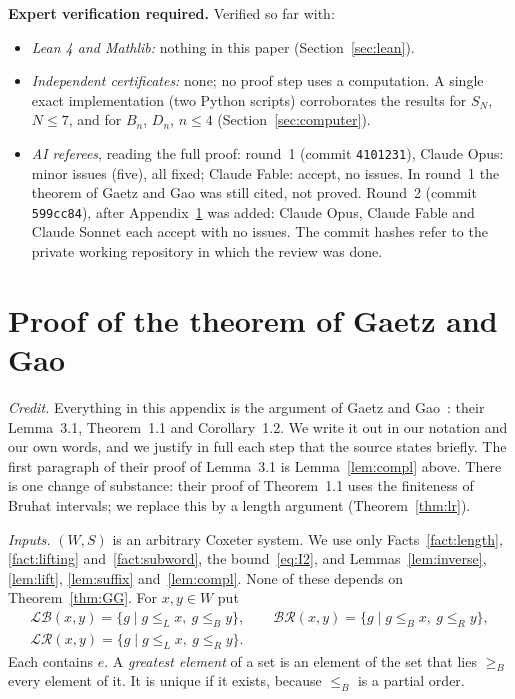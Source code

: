 \documentclass[11pt]{amsart}
\theoremstyle{definition}
\theoremstyle{remark}
\numberwithin{equation}{section}
\newcommand{\LB}{\mathcal{LB}}
\newcommand{\BR}{\mathcal{BR}}
\newcommand{\LR}{\mathcal{LR}}
\newcommand{\leR}{\le_R}
\newcommand{\leL}{\le_L}
\newcommand{\leB}{\le_B}
\newcommand{\geB}{\ge_B}
\begin{document}
\textbf{Expert verification required.} Verified so far with:
\begin{itemize}
\item \emph{Lean 4 and Mathlib:} nothing in this paper (Section~\ref{sec:lean}).
\item \emph{Independent certificates:} none; no proof step uses a computation. A single exact implementation (two Python scripts) corroborates the results for \(S_N\), \(N\le7\), and for \(B_n\), \(D_n\), \(n\le4\) (Section~\ref{sec:computer}).
\item \emph{AI referees}, reading the full proof:
round~1 (commit \texttt{4101231}), Claude Opus: minor issues (five), all fixed; Claude Fable: accept, no issues. In round~1 the theorem of Gaetz and Gao was still cited, not proved.
Round~2 (commit \texttt{599cc84}), after Appendix~\ref{app:GG} was added: Claude Opus, Claude Fable and Claude Sonnet each accept with no issues.
The commit hashes refer to the private working repository in which the review was done.
\end{itemize}

\appendix

\section{Proof of the theorem of Gaetz and Gao}\label{app:GG}

\emph{Credit.} Everything in this appendix is the argument of Gaetz and Gao~\cite[\S3]{GG}: their Lemma~3.1, Theorem~1.1 and Corollary~1.2. We write it out in our notation and our own words, and we justify in full each step that the source states briefly. The first paragraph of their proof of Lemma~3.1 is Lemma~\ref{lem:compl} above. There is one change of substance: their proof of Theorem~1.1 uses the finiteness of Bruhat intervals; we replace this by a length argument (Theorem~\ref{thm:lr}).

\emph{Inputs.} \((W,S)\) is an arbitrary Coxeter system. We use only Facts~\ref{fact:length}, \ref{fact:lifting} and~\ref{fact:subword}, the bound~\eqref{eq:I2}, and Lemmas~\ref{lem:inverse}, \ref{lem:lift}, \ref{lem:suffix} and~\ref{lem:compl}. None of these depends on Theorem~\ref{thm:GG}. For \(x,y\in W\) put
\begin{gather*}
\LB(x,y)=\{g\mid g\leL x,\ g\leB y\},\qquad
\BR(x,y)=\{g\mid g\leB x,\ g\leR y\},\\
\LR(x,y)=\{g\mid g\leL x,\ g\leR y\}.
\end{gather*}
Each contains \(e\). A \emph{greatest element} of a set is an element of the set that lies \(\geB\) every element of it. It is unique if it exists, because \(\leB\) is a partial order.
\end{document}
